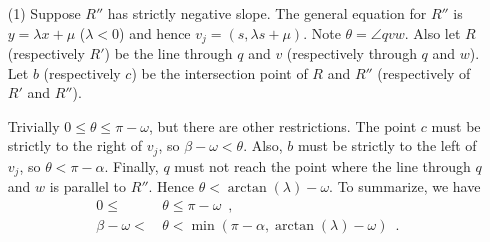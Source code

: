 \documentclass[11pt, oneside]{article}
\begin{document}
\begin{enumerate}
\item[(1)] Suppose $R''$ has strictly negative slope.
The general equation for $R''$ is $y=\lambda x+\mu$ ($\lambda<0$)
and hence $v_j=(s,\lambda s+\mu)$.
Note $\theta = \angle qvw$.
Also let $R$ 
(respectively $R'$)
be the line through $q$ and $v$
(respectively through $q$ and $w$).
Let $b$ 
(respectively $c$)
be the intersection point of $R$ and $R''$
(respectively of $R'$ and $R''$).

Trivially $0 \leq \theta \leq \pi-\omega$,
but there are other restrictions.
The point $c$ must be strictly to the right of $v_j$,
so $\beta-\omega < \theta$.
Also, $b$ must be strictly to the left of $v_j$, 
so $\theta < \pi-\alpha$.
Finally,
$q$ must not reach the point
where the line through $q$ and $w$
is parallel to $R''$.
Hence $\theta < \arctan(\lambda)-\omega$.
To summarize,
we have
\begin{align}
\label{lemma arc fixed midpoint on a line item constraint 1}
0 \leq &\,\theta \leq \pi-\omega \enspace,\\
\label{lemma arc fixed midpoint on a line item constraint 2}
\beta-\omega < &\,\theta < \min(\pi-\alpha,\arctan(\lambda)-\omega) \enspace.
\end{align}


\end{enumerate}
\end{document}
